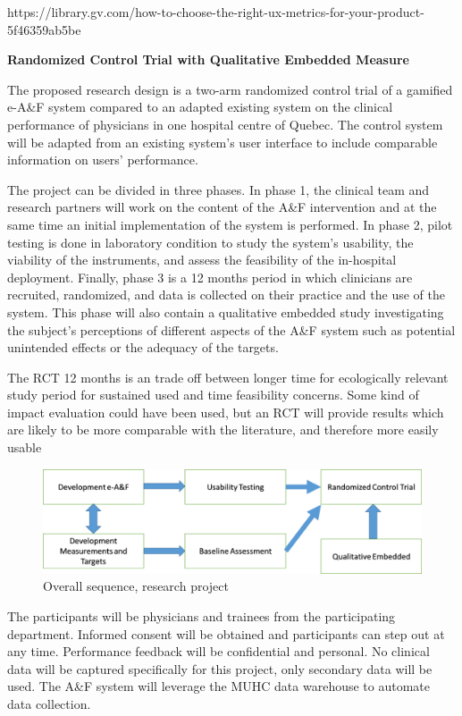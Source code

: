 https://library.gv.com/how-to-choose-the-right-ux-metrics-for-your-product-5f46359ab5be

\textbf{Randomized Control Trial with Qualitative Embedded Measure}

The proposed research design is a two-arm randomized control trial of a gamified e-A\&F system compared to an adapted existing system on the clinical performance of physicians in one hospital centre of Quebec. The control system will be adapted from an existing system’s user interface to include comparable information on users’ performance.

The project can be divided in three phases. In phase 1, the clinical team and research partners will work on the content of the A\&F intervention and at the same time an initial implementation of the system is performed. In phase 2, pilot testing is done in laboratory condition to study the system’s usability, the viability of the instruments, and assess the feasibility of the in-hospital deployment. Finally, phase 3 is a 12 months period in which clinicians are recruited, randomized, and data is collected on their practice and the use of the system. This phase will also contain a qualitative embedded study investigating the subject’s perceptions of different aspects of the A\&F system such as potential unintended effects or the adequacy of the targets.

The RCT 12 months is an trade off between longer time for ecologically relevant study period for sustained used and time feasibility concerns.
Some kind of impact evaluation could have been used, but an RCT will provide results which are likely to be more comparable with the literature, and therefore more easily usable 
\begin{figure}[h]
    \centering
    \includegraphics[width=\textwidth]{img/overall_sequence.png}
    \caption{Overall sequence, research project}
    \label{fig:ove_seq}
\end{figure}

The participants will be physicians and trainees from the participating department. Informed consent will be obtained and participants can step out at any time. Performance feedback will be confidential and personal. No clinical data will be captured specifically for this project, only secondary data will be used. The A\&F system will leverage the MUHC data warehouse to automate data collection.


